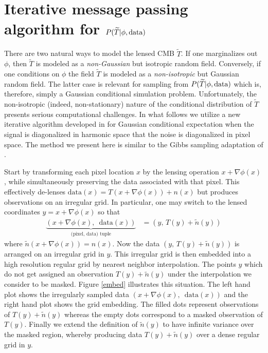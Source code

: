 \documentclass[iop,revtex4,apj,onecolumn]{emulateapj}
\begin{document}
%
%
\section{Iterative message passing algorithm for $ P(\widetilde T |  \phi,\text{\rm data})$}
\label{Section: iterative message passing section}

There are two natural ways to model the lensed CMB $\widetilde T$. If one marginalizes out $\phi$, then $\widetilde T$ is modeled as a {\em non-Gaussian} but isotropic random field. Conversely, if one conditions on $\phi$ the field $\widetilde T$ is modeled as a {\em non-isotropic} but Gaussian random field. The latter case is relevant for sampling from $ P(\widetilde T |  \phi,\text{\rm data})$ which  is, therefore,  simply a Gaussian conditional simulation problem. Unfortunately, the non-isotropic (indeed, non-stationary) nature of the conditional distribution of $\widetilde T$ presents serious computational challenges. In what follows we utilize a new iterative algorithm developed in \cite{elsner2013efficient} for Gaussian conditional expectation when the signal is diagonalized in harmonic space that the noise is diagonalized in pixel space. The method we present here is similar to the Gibbs sampling adaptation of \cite{jasche2014matrix}. 


Start by transforming each pixel location $x$ by the lensing operation $x+\nabla \phi(x)$, while simultaneously preserving the data associated with that pixel. This effectively de-lenses  $\text{data}(x)= T(x+\nabla \phi(x))+n(x)$ but produces observations on an irregular grid. In particular, one may switch to the lensed coordinates $y = x+\nabla\phi(x)$ so that
\begin{align}
\nonumber
\underbrace{(x +\nabla \phi(x),\, \text{ data}(x))}_{\text{(pixel, data) tuple}} & = (y, \, T(y) + \tilde n(y)) 
\end{align}
where $\tilde n(x+\nabla\phi(x))=n(x)$.  Now the data $(y, \, T(y) + \tilde n(y))$ is arranged on an irregular grid in $y$. This irregular grid is then embedded into a high resolution regular grid by nearest neighbor interpolation. The points $y$ which do not get assigned an observation $T(y)+\tilde n(y)$ under the interpolation we consider to be masked. 
Figure \ref{embed} illustrates this situation. The left hand plot shows the irregularly sampled data $(x +\nabla \phi(x),\, \text{ data}(x))$ and the right hand plot shows the grid embedding. The filled dots represent observations of $T(y) + \tilde n(y)$ whereas the empty dots correspond to a masked observation of $T(y)$.  Finally we extend the definition of $\tilde n(y)$ to have infinite variance over the masked region, whereby producing data $T(y)+\tilde n(y)$ over a dense regular grid in $y$.
\end{document}
